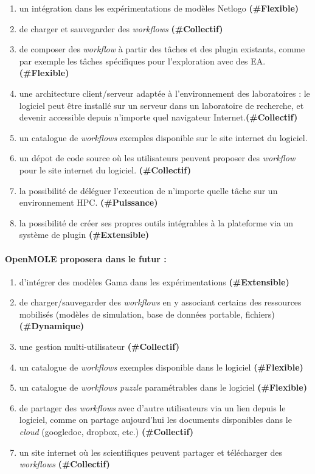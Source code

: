 \begin{enumerate}
\item un intégration dans les expérimentations de modèles Netlogo \textbf{(\#Flexible)}
\item de charger et sauvegarder des \textit{workflows} \textbf{(\#Collectif)}
\item de composer des \textit{workflow} à partir des tâches et des plugin existants, comme par exemple les tâches spécifiques pour l'exploration avec des EA. \textbf{(\#Flexible)}
\item une architecture client/serveur adaptée à l'environnement des laboratoires : le logiciel peut être installé sur un serveur dans un laboratoire de recherche, et devenir accessible depuis n'importe quel navigateur Internet.\textbf{(\#Collectif)}   
\item un catalogue de \textit{workflows} exemples disponible sur le site internet du logiciel.
\item un dépot de code source où les utilisateurs peuvent proposer des \textit{workflow} pour le site internet du logiciel. \textbf{(\#Collectif)}
\item la possibilité de déléguer l'execution de n'importe quelle tâche sur un environnement HPC. \textbf{(\#Puissance)}
\item la possibilité de créer ses propres outils intégrables à la plateforme via un système de plugin \textbf{(\#Extensible)}
\end{enumerate}

\paragraph{OpenMOLE proposera dans le futur :}

\begin{enumerate}
\item d'intégrer des modèles Gama dans les expérimentations \textbf{(\#Extensible)}
\item de charger/sauvegarder des \textit{workflows} en y associant certains des ressources mobilisés (modèles de simulation, base de données portable, fichiers) \textbf{(\#Dynamique)}
\item une gestion multi-utilisateur \textbf{(\#Collectif)}
\item un catalogue de \textit{workflows} exemples disponible dans le logiciel \textbf{(\#Flexible)}
\item un catalogue de \textit{workflows puzzle} paramétrables dans le logiciel \textbf{(\#Flexible)}
\item de partager des \textit{workflows} avec d'autre utilisateurs via un lien depuis le logiciel, comme on partage aujourd'hui les documents disponibles dans le \textit{cloud} (googledoc, dropbox, etc.)  \textbf{(\#Collectif)}
\item un site internet où les scientifiques peuvent partager et télécharger des \textit{workflows}  \textbf{(\#Collectif)}
\end{enumerate}

